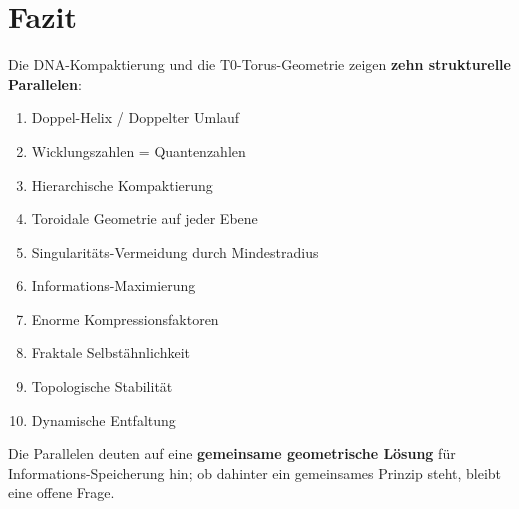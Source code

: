 	\begin{table}[H]
		\centering
		\small
		\caption{Skalen-Vergleich (qualitativ)}
	\end{table}

	\section{Fazit}

	\begin{keyresult}[Hauptergebnis]
		Die DNA-Kompaktierung und die T0-Torus-Geometrie zeigen \textbf{zehn strukturelle Parallelen}:

		\vspace{0.3cm}

		\begin{enumerate}
			\item Doppel-Helix / Doppelter Umlauf
			\item Wicklungszahlen = Quantenzahlen
			\item Hierarchische Kompaktierung
			\item Toroidale Geometrie auf jeder Ebene
			\item Singularitäts-Vermeidung durch Mindestradius
			\item Informations-Maximierung
			\item Enorme Kompressionsfaktoren
			\item Fraktale Selbstähnlichkeit
			\item Topologische Stabilität
			\item Dynamische Entfaltung
		\end{enumerate}

		\vspace{0.3cm}

		Die Parallelen deuten auf eine \textbf{gemeinsame geometrische Lösung} für Informations-Speicherung hin; ob dahinter ein gemeinsames Prinzip steht, bleibt eine offene Frage.
	\end{keyresult}

